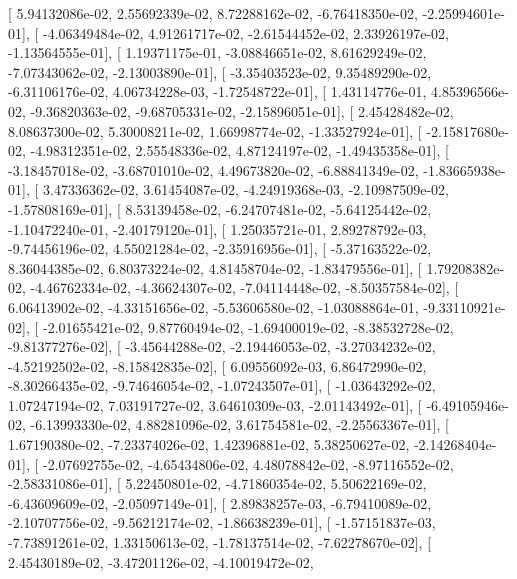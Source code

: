 \documentclass{article}
\begin{document}
       [  5.94132086e-02,   2.55692339e-02,   8.72288162e-02,
         -6.76418350e-02,  -2.25994601e-01],
       [ -4.06349484e-02,   4.91261717e-02,  -2.61544452e-02,
          2.33926197e-02,  -1.13564555e-01],
       [  1.19371175e-01,  -3.08846651e-02,   8.61629249e-02,
         -7.07343062e-02,  -2.13003890e-01],
       [ -3.35403523e-02,   9.35489290e-02,  -6.31106176e-02,
          4.06734228e-03,  -1.72548722e-01],
       [  1.43114776e-01,   4.85396566e-02,  -9.36820363e-02,
         -9.68705331e-02,  -2.15896051e-01],
       [  2.45428482e-02,   8.08637300e-02,   5.30008211e-02,
          1.66998774e-02,  -1.33527924e-01],
       [ -2.15817680e-02,  -4.98312351e-02,   2.55548336e-02,
          4.87124197e-02,  -1.49435358e-01],
       [ -3.18457018e-02,  -3.68701010e-02,   4.49673820e-02,
         -6.88841349e-02,  -1.83665938e-01],
       [  3.47336362e-02,   3.61454087e-02,  -4.24919368e-03,
         -2.10987509e-02,  -1.57808169e-01],
       [  8.53139458e-02,  -6.24707481e-02,  -5.64125442e-02,
         -1.10472240e-01,  -2.40179120e-01],
       [  1.25035721e-01,   2.89278792e-03,  -9.74456196e-02,
          4.55021284e-02,  -2.35916956e-01],
       [ -5.37163522e-02,   8.36044385e-02,   6.80373224e-02,
          4.81458704e-02,  -1.83479556e-01],
       [  1.79208382e-02,  -4.46762334e-02,  -4.36624307e-02,
         -7.04114448e-02,  -8.50357584e-02],
       [  6.06413902e-02,  -4.33151656e-02,  -5.53606580e-02,
         -1.03088864e-01,  -9.33110921e-02],
       [ -2.01655421e-02,   9.87760494e-02,  -1.69400019e-02,
         -8.38532728e-02,  -9.81377276e-02],
       [ -3.45644288e-02,  -2.19446053e-02,  -3.27034232e-02,
         -4.52192502e-02,  -8.15842835e-02],
       [  6.09556092e-03,   6.86472990e-02,  -8.30266435e-02,
         -9.74646054e-02,  -1.07243507e-01],
       [ -1.03643292e-02,   1.07247194e-02,   7.03191727e-02,
          3.64610309e-03,  -2.01143492e-01],
       [ -6.49105946e-02,  -6.13993330e-02,   4.88281096e-02,
          3.61754581e-02,  -2.25563367e-01],
       [  1.67190380e-02,  -7.23374026e-02,   1.42396881e-02,
          5.38250627e-02,  -2.14268404e-01],
       [ -2.07692755e-02,  -4.65434806e-02,   4.48078842e-02,
         -8.97116552e-02,  -2.58331086e-01],
       [  5.22450801e-02,  -4.71860354e-02,   5.50622169e-02,
         -6.43609609e-02,  -2.05097149e-01],
       [  2.89838257e-03,  -6.79410089e-02,  -2.10707756e-02,
         -9.56212174e-02,  -1.86638239e-01],
       [ -1.57151837e-03,  -7.73891261e-02,   1.33150613e-02,
         -1.78137514e-02,  -7.62278670e-02],
       [  2.45430189e-02,  -3.47201126e-02,  -4.10019472e-02,
\end{document}
